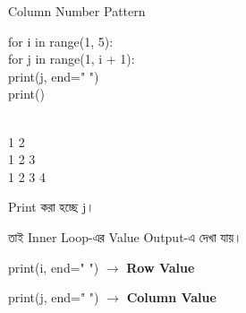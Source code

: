 \begin{codeoutputbox}{Column Number Pattern}

\noindent
\begin{minipage}[t]{0.53\linewidth}
\codeheading

\begin{english}
\ttfamily
for i in range(1, 5):\\
\hspace*{4mm}for j in range(1, i + 1):\\
\hspace*{8mm}print(j, end=" ")\\
\hspace*{4mm}print()
\end{english}

\end{minipage}
\hfill
\begin{minipage}[t]{0.43\linewidth}
\outputheading

\begin{english}
\\
1 2\\
1 2 3\\
1 2 3 4
\end{english}

\medskip

Print করা হচ্ছে
\textenglish{\ttfamily j}।

তাই Inner Loop-এর Value Output-এ দেখা যায়।

\end{minipage}

\end{codeoutputbox}

\begin{rememberbox}

\begin{center}

\textenglish{\ttfamily print(i, end=" ")}
\(\longrightarrow\)
\textbf{Row Value}

\qquad

\textenglish{\ttfamily print(j, end=" ")}
\(\longrightarrow\)
\textbf{Column Value}

\end{center}

\end{rememberbox}



